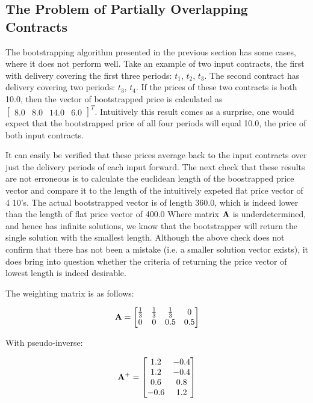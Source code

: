 \documentclass{article}
\begin{document}
\subsection{The Problem of Partially Overlapping Contracts}

The bootstrapping algorithm presented in the previous section has some cases, 
where it does not perform well. Take an example of two input contracts, the
first with delivery covering the first three periods: $t_1$, $t_2$, $t_3$. The second
contract has delivery covering two periods: $t_3$, $t_4$. If the prices of these
two contracts is both 10.0, then the vector of bootstrapped price is calculated
as $\begin{bmatrix}8.0 & 8.0 & 14.0 & 6.0\end{bmatrix}^T$. Intuitively this 
result comes as a surprise, one would expect that the bootstrapped price of
all four periods will equal 10.0, the price of both input contracts.

It can easily be verified that these prices average back to the input contracts
over just the delivery periods of each input forward. The next check
that these results are not erroneous is to calculate the euclidean length of
the boostrapped price vector and compare it to the length of the intuitively 
expeted flat price vector of 4 10's. The actual bootstrapped vector is of length 360.0, 
which is indeed lower than the length of flat price vector of 400.0 Where matrix
$\mathbf{A}$ is underdetermined, and hence has infinite solutions, we know that the 
bootstrapper will return the single solution with the smallest length. Although
the above check does not confirm that there has not been a mistake (i.e. a smaller
solution vector exists), it does bring into question whether the criteria of 
returning the price vector of lowest length is indeed desirable.


The weighting matrix is as follows:

\begin{equation}
    \mathbf{A} = \begin{bmatrix}
        \frac{1}{3} & \frac{1}{3} & \frac{1}{3} & 0 \\
        0 & 0 & 0.5 & 0.5
    \end{bmatrix}
\end{equation}

With pseudo-inverse:

\begin{equation}
    \mathbf{A}^+ = \begin{bmatrix}
        1.2 & -0.4 \\
        1.2 & -0.4 \\
        0.6 & 0.8 \\
        -0.6 & 1.2 \\
    \end{bmatrix}
\end{equation}
\end{document}
